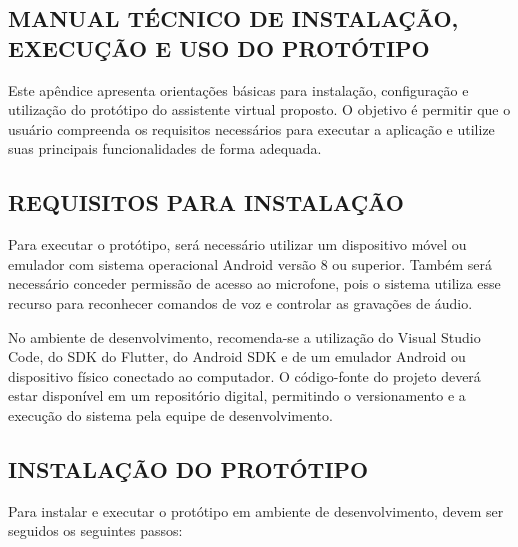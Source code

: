 \documentclass[12pt,oneside,a4paper,brazil,final]{abntex2}
\begin{document}
\begin{apendicesenv}



\chapter{MANUAL TÉCNICO DE INSTALAÇÃO, EXECUÇÃO E USO DO PROTÓTIPO}



Este apêndice apresenta orientações básicas para instalação, configuração e utilização do protótipo do assistente virtual proposto. O objetivo é permitir que o usuário compreenda os requisitos necessários para executar a aplicação e utilize suas principais funcionalidades de forma adequada.



\section{REQUISITOS PARA INSTALAÇÃO}



Para executar o protótipo, será necessário utilizar um dispositivo móvel ou emulador com sistema operacional Android versão 8 ou superior. Também será necessário conceder permissão de acesso ao microfone, pois o sistema utiliza esse recurso para reconhecer comandos de voz e controlar as gravações de áudio.



No ambiente de desenvolvimento, recomenda-se a utilização do Visual Studio Code, do SDK do Flutter, do Android SDK e de um emulador Android ou dispositivo físico conectado ao computador. O código-fonte do projeto deverá estar disponível em um repositório digital, permitindo o versionamento e a execução do sistema pela equipe de desenvolvimento.



\section{INSTALAÇÃO DO PROTÓTIPO}



Para instalar e executar o protótipo em ambiente de desenvolvimento, devem ser seguidos os seguintes passos:



\begin{enumerate}


\end{enumerate}
\end{apendicesenv}
\end{document}
